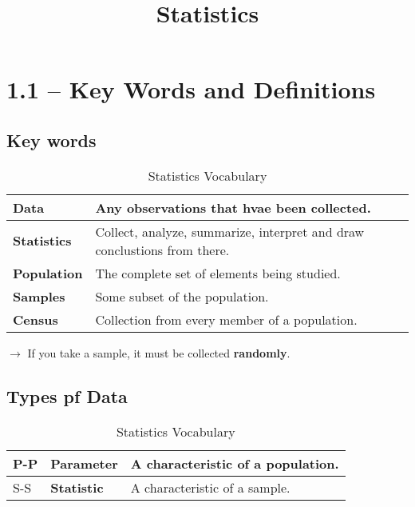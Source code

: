 \documentclass{book}
\title{Statistics}
\author{}
\date{}
\begin{document}
\maketitle
\tableofcontents


\chapter{1.1 -- Key Words and Definitions}

\section{Key words}

\begin{table}[htbp]
    \centering
    \begin{tabular}{>{\bfseries}l l}
        \toprule
        Data & Any observations that hvae been collected. \\
        \midrule
        Statistics & Collect, analyze, summarize, interpret and draw conclustions from there. \\
        \midrule
        Population & The complete set of elements being studied. \\
        \midrule
        Samples & Some subset of the population.\\
        \midrule
        Census & Collection from every member of a population. \\
        \bottomrule
    \end{tabular}
    \caption{Statistics Vocabulary}
    \label{tab:vocab}
\end{table}

$\to$ If you take a sample, it must be collected \textbf{randomly}.

\section{Types pf Data}

\begin{table}[htbp]
    \centering
    \begin{tabular}{l |>{\bfseries}l l}
        \toprule
        P-P & Parameter & A characteristic of a population. \\
        \midrule
        S-S & Statistic & A characteristic of a sample. \\
        \bottomrule
    \end{tabular}
    \caption{Statistics Vocabulary}
    \label{tab:vocab-2}
\end{table}
\end{document}
